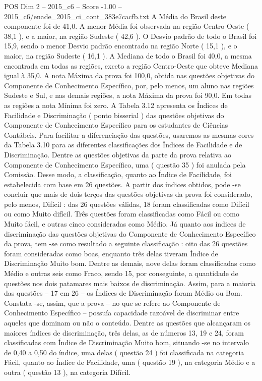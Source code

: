 \begin{textsample}{POS Dim 2 – 2015\_c6 – Score -1.00 – 2015\_c6/enade\_2015\_ci\_cont\_383e7cacfb.txt}
A Média do Brasil deste componente foi de 41,0.
A menor Média foi observada na região Centro-Oeste ( 38,1 ), e a maior, na região Sudeste ( 42,6 ).
O Desvio padrão de todo o Brasil foi 15,9, sendo o menor Desvio padrão encontrado na região Norte ( 15,1 ), e o maior, na região Sudeste ( 16,1 ).
A Mediana de todo o Brasil foi 40,0, a mesma encontrada em todas as regiões, exceto a região Centro-Oeste que obteve Mediana igual à 35,0.
A nota Máxima da prova foi 100,0, obtida nas questões objetivas do Componente de Conhecimento Específico, por, pelo menos, um aluno nas regiões Sudeste e Sul, e nas demais regiões, a nota Máxima da prova foi 90,0.
Em todas as regiões a nota Mínima foi zero.
A Tabela 3.12 apresenta os Índices de Facilidade e Discriminação ( ponto bisserial ) das questões objetivas do Componente de Conhecimento Específico para os estudantes de Ciências Contábeis.
Para facilitar a diferenciação das questões, usaremos as mesmas cores da Tabela 3.10 para as diferentes classificações dos Índices de Facilidade e de Discriminação.
Dentre as questões objetivas da parte da prova relativa ao Componente de Conhecimento Específico, uma ( questão 35 ) foi anulada pela Comissão.
Desse modo, a classificação, quanto ao Índice de Facilidade, foi estabelecida com base em 26 questões.
A partir dos índices obtidos, pode -se concluir que mais de dois terços das questões objetivas da prova foi considerado, pelo menos, Difícil : das 26 questões válidas, 18 foram classificadas como Difícil ou como Muito difícil.
Três questões foram classificadas como Fácil ou como Muito fácil, e outras cinco consideradas como Médio.
Já quanto aos índices de discriminação das questões objetivas do Componente de Conhecimento Específico da prova, tem -se como resultado a seguinte classificação : oito das 26 questões foram consideradas como boas, enquanto três delas tiveram Índice de Discriminação Muito bom.
Dentre as demais, nove delas foram classificadas como Médio e outras seis como Fraco, sendo 15, por conseguinte, a quantidade de questões nos dois patamares mais baixos de discriminação.
Assim, para a maioria das questões – 17 em 26 – os Índices de Discriminação foram Médio ou Bom.
Constata -se, assim, que a prova – no que se refere ao Componente de Conhecimento Específico – possuía capacidade razoável de discriminar entre aqueles que dominam ou não o conteúdo.
Dentre as questões que alcançaram os maiores índices de discriminação, três delas, as de números 13, 19 e 24, foram classificadas com Índice de Discriminação Muito bom, situando -se no intervalo de 0,40 a 0,50 do índice, uma delas ( questão 24 ) foi classificada na categoria Fácil, quanto ao Índice de Facilidade, uma ( questão 19 ), na categoria Médio e a outra ( questão 13 ), na categoria Difícil.

\end{textsample}
